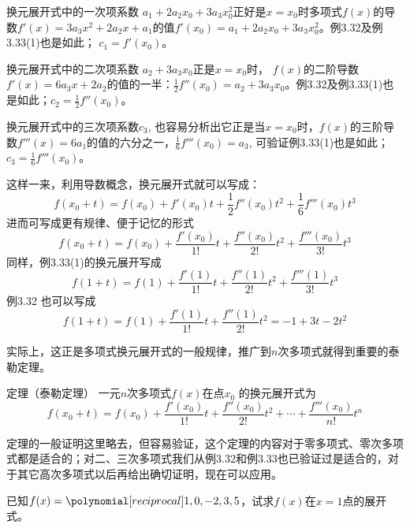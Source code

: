 换元展开式中的一次项系数 $a_1+2a_2x_0+3a_3x_0^2$正好是$x=x_0$时多项式$f(x)$的导数$f'(x)=3a_3x^2+2a_2x+a_1$的值$f'(x_0)=a_1+2a_2x_0+3a_3x_0^2$。例3.32及例3.33(1)也是如此；
$c_1 =f' (x_0)$。

换元展开式中的二次项系数 $a_2+3a_3x_0$正是$x=x_0$时，
$f(x)$的二阶导数$f'(x)=6a_3x+2a_2$的值的一半：$\frac{1}{2}f''(x_0)=a_2+3a_3x_0$。例3.32及例3.33(1)也是如此；$c_2=\frac{1}{2}f''(x_0)$。

换元展开式中的三次项系数$c_3$, 也容易分析出它正是当$x=x_0$时，$f(x)$的三阶导数$f'''(x)=6a_1$的值的六分之一，$\frac{1}{6}f'''(x_0)=a_3$, 可验证例3.33(1)也是如此；
$c_3=\frac{1}{6}f''' (x_0)$。

这样一来，利用导数概念，换元展开式就可以写成：
\[f(x_0+t)=f(x_0)+f'(x_0)t+\frac{1}{2}f''(x_0)t^2+\frac{1}{6}f'''(x_0)t^3\]    
进而可写成更有规律、便于记忆的形式
\[f(x_0+t)=f(x_0)+\frac{f'(x_0)}{1!}t+\frac{f''(x_0)}{2!}t^2+\frac{f'''(x_0)}{3!}t^3\]    
同样，例3.33(1)的换元展开写成
\[f (1+t) =f (1) +\frac{f'(1)}{1!}t+\frac{f''(1)}{2!}t^2+\frac{f'''(1)}{3!}t^3\]
例3.32 也可以写成
\[f (1+t) =f (1) +\frac{f'(1)}{1!}t+\frac{f''(1)}{2!}t^2=-1+3t-2t^2\]

实际上，这正是多项式换元展开式的一般规律，推广到$n$次多项式就得到重要的泰勒定理。
    
\begin{blk}{定理（泰勒定理）}
 一元$n$次多项式$f(x)$在点$x_0$
的换元展开式为
\begin{equation}
    f(x_0+t)=f(x_0)+\frac{f'(x_0)}{1!}t+\frac{f''(x_0)}{2!}t^2+\cdots+\frac{f'''(x_0)}{n!}t^n
\end{equation}   
\end{blk}

定理的一般证明这里略去，但容易验证，这个定理的内容对于零多项式、零次多项式都是适合的；对二、三次多项式我们从例3.32和例3.33也已验证过是适合的，对于其它高次多项式以后再给出确切证明，现在可以应用。

    \begin{example}
已知$f(x)=\poly{1,0,-2,3,5}$，试求$f(x)$在$x=1$点的展开式。    
    \end{example}    
    
